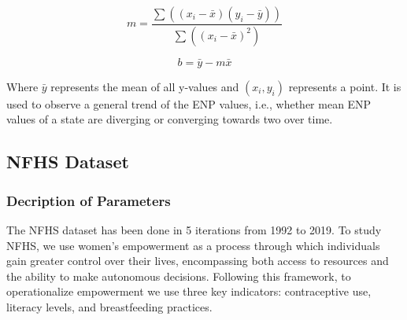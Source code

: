\begin{equation}
m = \frac{\sum((x_i - \bar{x})(y_i - \bar{y}))}{\sum((x_i - \bar{x})^2)}
\end{equation}

\begin{equation}
b = \bar{y} - m\bar{x}
\end{equation}

Where $\bar{y}$ represents the mean of all y-values and $(x_i,y_i)$ represents a point. It is used to observe a general trend of the ENP values, i.e., whether mean ENP values of a state are diverging or converging towards two over time.

\subsection{NFHS Dataset}
\subsubsection{Decription of Parameters}
The NFHS dataset has been done in 5 iterations from 1992 to 2019. To study NFHS, we use women's empowerment as a process through which individuals gain greater control over their lives, encompassing both access to resources and the ability to make autonomous decisions. Following this framework, to operationalize empowerment we use three key indicators: contraceptive use, literacy levels, and breastfeeding practices.

